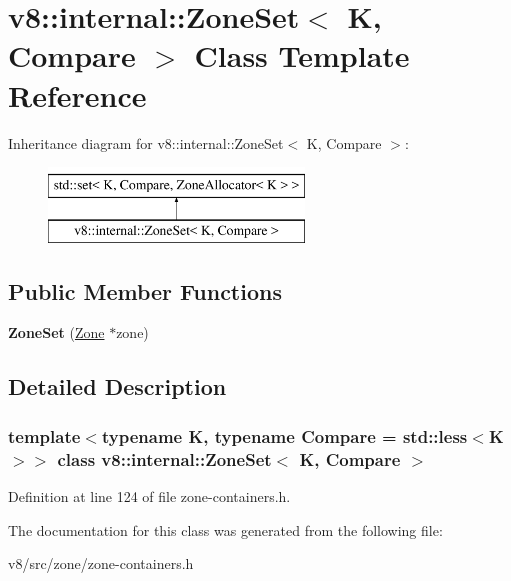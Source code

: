 \hypertarget{classv8_1_1internal_1_1ZoneSet}{}\section{v8\+:\+:internal\+:\+:Zone\+Set$<$ K, Compare $>$ Class Template Reference}
\label{classv8_1_1internal_1_1ZoneSet}
Inheritance diagram for v8\+:\+:internal\+:\+:Zone\+Set$<$ K, Compare $>$\+:\begin{figure}[H]
\begin{center}
\leavevmode
\includegraphics[height=2.000000cm]{classv8_1_1internal_1_1ZoneSet}
\end{center}
\end{figure}
\subsection*{Public Member Functions}
\begin{DoxyCompactItemize}
\item 
\mbox{\label{classv8_1_1internal_1_1ZoneSet_a01a7e1f0423f0b3d88e34ffcdc79360d}} 
{\bfseries Zone\+Set} (\mbox{\hyperlink{classv8_1_1internal_1_1Zone}{Zone}} $\ast$zone)
\end{DoxyCompactItemize}


\subsection{Detailed Description}
\subsubsection*{template$<$typename K, typename Compare = std\+::less$<$\+K$>$$>$\newline
class v8\+::internal\+::\+Zone\+Set$<$ K, Compare $>$}



Definition at line 124 of file zone-\/containers.\+h.



The documentation for this class was generated from the following file\+:\begin{DoxyCompactItemize}
\item 
v8/src/zone/zone-\/containers.\+h\end{DoxyCompactItemize}
